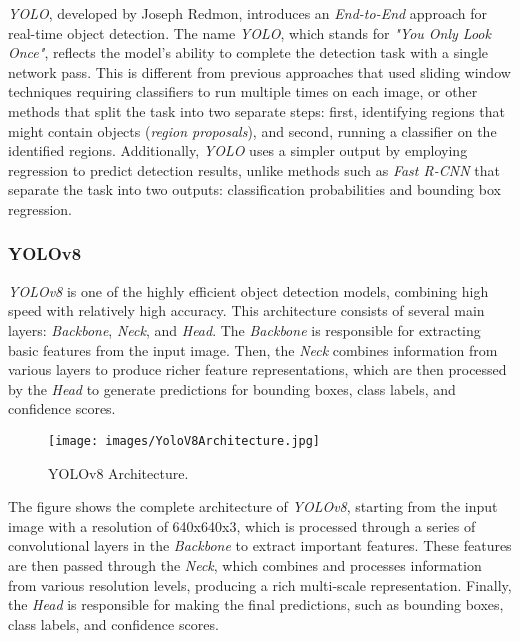 \emph{YOLO}, developed by Joseph Redmon, introduces an \emph{End-to-End} approach for real-time object detection. The name \emph{YOLO}, which stands for \emph{"You Only Look Once"}, reflects the model's ability to complete the detection task with a single network pass. This is different from previous approaches that used sliding window techniques requiring classifiers to run multiple times on each image, or other methods that split the task into two separate steps: first, identifying regions that might contain objects (\emph{region proposals}), and second, running a classifier on the identified regions. Additionally, \emph{YOLO} uses a simpler output by employing regression to predict detection results, unlike methods such as \emph{Fast R-CNN} that separate the task into two outputs: classification probabilities and bounding box regression.

\subsubsection{YOLOv8}
\label{subsubsec:YOLOv8}

\emph{YOLOv8} is one of the highly efficient object detection models, combining high speed with relatively high accuracy. This architecture consists of several main layers: \emph{Backbone}, \emph{Neck}, and \emph{Head}. The \emph{Backbone} is responsible for extracting basic features from the input image. Then, the \emph{Neck} combines information from various layers to produce richer feature representations, which are then processed by the \emph{Head} to generate predictions for bounding boxes, class labels, and confidence scores.

\begin{figure}[H] 
  \centering 
  \texttt{[image: images/YoloV8Architecture.jpg]} 
  \caption{YOLOv8 Architecture.} 
  \label{fig:YOLOv8Architecture} 
\end{figure}

The figure shows the complete architecture of \emph{YOLOv8}, starting from the input image with a resolution of 640x640x3, which is processed through a series of convolutional layers in the \emph{Backbone} to extract important features. These features are then passed through the \emph{Neck}, which combines and processes information from various resolution levels, producing a rich multi-scale representation. Finally, the \emph{Head} is responsible for making the final predictions, such as bounding boxes, class labels, and confidence scores.

